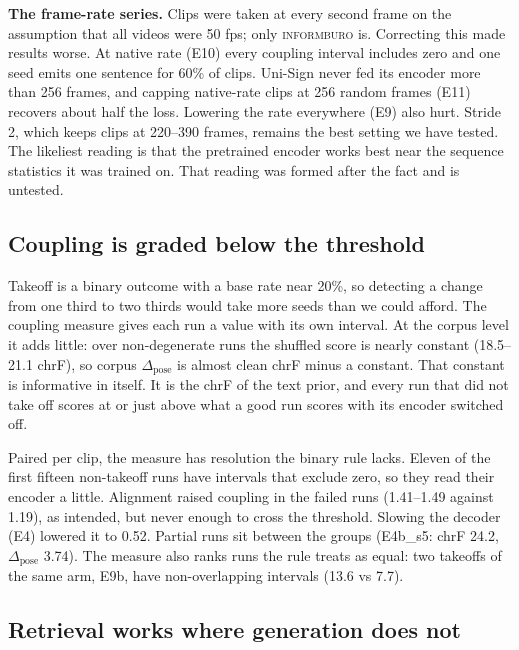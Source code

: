 \documentclass[11pt,twocolumn,a4paper]{article}
\newcommand{\cpl}{\Delta_{\text{pose}}}
\newcommand{\src}[1]{\textsc{#1}}
\newcommand{\ib}{\src{informburo}}
\renewcommand{\paragraph}[1]{\par\smallskip\noindent\textbf{#1}\hspace{0.5em}}
\begin{document}
\paragraph{The frame-rate series.}
Clips were taken at every second frame on the assumption that all videos were 50 fps; only \ib{} is. Correcting this made results worse. At native rate (E10) every coupling interval includes zero and one seed emits one sentence for 60\% of clips. Uni-Sign never fed its encoder more than 256 frames, and capping native-rate clips at 256 random frames (E11) recovers about half the loss. Lowering the rate everywhere (E9) also hurt. Stride 2, which keeps clips at 220--390 frames, remains the best setting we have tested. The likeliest reading is that the pretrained encoder works best near the sequence statistics it was trained on. That reading was formed after the fact and is untested.

\subsection{Coupling is graded below the threshold}
\label{sec:coupling}

Takeoff is a binary outcome with a base rate near 20\%, so detecting a change from one third to two thirds would take more seeds than we could afford. The coupling measure gives each run a value with its own interval. At the corpus level it adds little: over non-degenerate runs the shuffled score is nearly constant (18.5--21.1 chrF), so corpus $\cpl$ is almost clean chrF minus a constant. That constant is informative in itself. It is the chrF of the text prior, and every run that did not take off scores at or just above what a good run scores with its encoder switched off.

Paired per clip, the measure has resolution the binary rule lacks. Eleven of the first fifteen non-takeoff runs have intervals that exclude zero, so they read their encoder a little. Alignment raised coupling in the failed runs (1.41--1.49 against 1.19), as intended, but never enough to cross the threshold. Slowing the decoder (E4) lowered it to 0.52. Partial runs sit between the groups (E4b\_s5: chrF 24.2, $\cpl$ 3.74). The measure also ranks runs the rule treats as equal: two takeoffs of the same arm, E9b, have non-overlapping intervals (13.6 vs 7.7).

\subsection{Retrieval works where generation does not}
\label{sec:retrieval}
\end{document}
